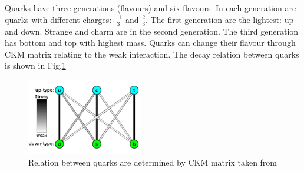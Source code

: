 \\
\\Quarks have three generations (flavours) and six flavours. In each generation are quarks with different charges: $\frac{-1}{3}$ and $\frac{2}{3}$. The first generation are the lightest: up and down. Strange and charm are in the second generation. The third generation has bottom and top with highest mass. Quarks can change their flavour through CKM matrix relating to the weak interaction. The decay relation between quarks is shown in Fig.\ref{Fig:quarks}
\\    
\begin{figure}[!h]                
	\includegraphics[width=0.45\textwidth]{Chapter1/quarks.png}
	\centering
	\begin{center}
		\caption{Relation between quarks are determined by CKM matrix taken from \cite{ckm_timothy}}
		\label{Fig:quarks}            
	\end{center}
\end{figure}

